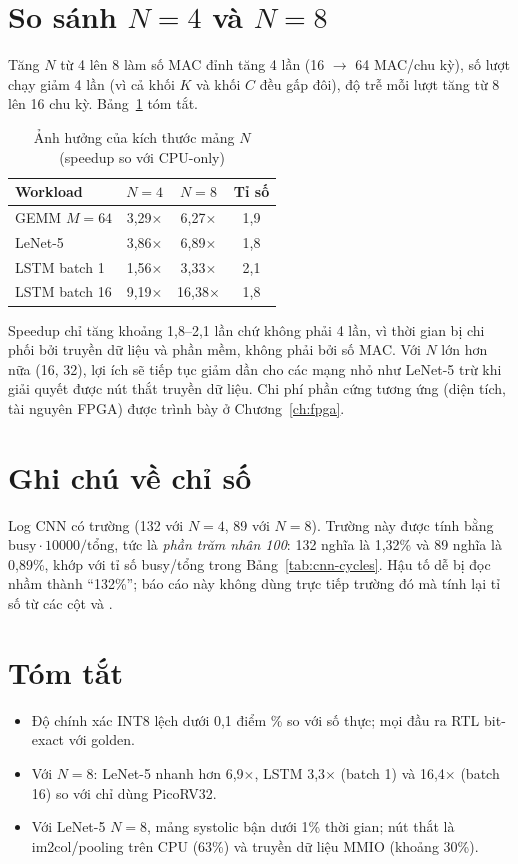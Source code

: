 \section{So sánh \texorpdfstring{$N=4$}{N=4} và \texorpdfstring{$N=8$}{N=8}}
\label{sec:n4n8}
Tăng $N$ từ 4 lên 8 làm số MAC đỉnh tăng 4 lần (16 $\to$ 64 MAC/chu kỳ), số lượt chạy giảm 4 lần (vì cả khối $K$ và khối $C$ đều gấp đôi), độ trễ mỗi lượt tăng từ 8 lên 16 chu kỳ. Bảng~\ref{tab:n4n8} tóm tắt.

\begin{table}[H]
  \centering
  \caption{Ảnh hưởng của kích thước mảng $N$ (speedup so với CPU-only)}
  \label{tab:n4n8}
  \begin{tabular}{lccc}
    \toprule
    Workload & $N=4$ & $N=8$ & Tỉ số \\
    \midrule
    GEMM $M=64$ & 3,29$\times$ & 6,27$\times$ & 1,9 \\
    LeNet-5 & 3,86$\times$ & 6,89$\times$ & 1,8 \\
    LSTM batch 1 & 1,56$\times$ & 3,33$\times$ & 2,1 \\
    LSTM batch 16 & 9,19$\times$ & 16,38$\times$ & 1,8 \\
    \bottomrule
  \end{tabular}
\end{table}

Speedup chỉ tăng khoảng 1,8--2,1 lần chứ không phải 4 lần, vì thời gian bị chi phối bởi truyền dữ liệu và phần mềm, không phải bởi số MAC. Với $N$ lớn hơn nữa (16, 32), lợi ích sẽ tiếp tục giảm dần cho các mạng nhỏ như LeNet-5 trừ khi giải quyết được nút thắt truyền dữ liệu. Chi phí phần cứng tương ứng (diện tích, tài nguyên FPGA) được trình bày ở Chương~\ref{ch:fpga}.



\section{Ghi chú về chỉ số }
Log CNN có trường  (132 với $N=4$, 89 với $N=8$). Trường này được tính bằng $\text{busy}\cdot\num{10000}/\text{tổng}$, tức là \emph{phần trăm nhân 100}: 132 nghĩa là 1,32\% và 89 nghĩa là 0,89\%, khớp với tỉ số busy/tổng trong Bảng~\ref{tab:cnn-cycles}. Hậu tố  dễ bị đọc nhầm thành ``132\%''; báo cáo này không dùng trực tiếp trường đó mà tính lại tỉ số từ các cột  và .

\section{Tóm tắt}
\begin{itemize}
  \item Độ chính xác INT8 lệch dưới 0,1 điểm \% so với số thực; mọi đầu ra RTL bit-exact với golden.
  \item Với $N=8$: LeNet-5 nhanh hơn 6,9$\times$, LSTM 3,3$\times$ (batch 1) và 16,4$\times$ (batch 16) so với chỉ dùng PicoRV32.
  \item Với LeNet-5 $N=8$, mảng systolic bận dưới 1\% thời gian; nút thắt là im2col/pooling trên CPU (63\%) và truyền dữ liệu MMIO (khoảng 30\%).
\end{itemize}
